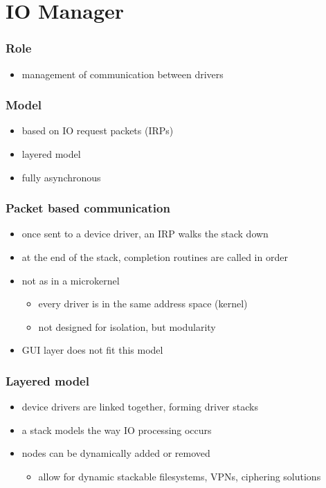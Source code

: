 %
%

\section{IO Manager}


\begin{frame}
 \frametitle{Role}
 \begin{itemize}
  \item
    management of communication between drivers
 \end{itemize}
\end{frame}


\begin{frame}
 \frametitle{Model}
 \begin{itemize}
  \item
    based on IO request packets (IRPs)
  \item
    layered model
  \item
    fully asynchronous
 \end{itemize}
\end{frame}


\begin{frame}
 \frametitle{Packet based communication}
 \begin{itemize}
  \item
    once sent to a device driver, an IRP walks the stack down
  \item
    at the end of the stack, completion routines are called in order
  \item
    not as in a microkernel
    \begin{itemize}
      \item
        every driver is in the same address space (kernel)
      \item
        not designed for isolation, but modularity
    \end{itemize}
  \item
    GUI layer does not fit this model
 \end{itemize}
\end{frame}


\begin{frame}
 \frametitle{Layered model}
 \begin{itemize}
   \item
     device drivers are linked together, forming driver stacks
   \item
     a stack models the way IO processing occurs
   \item
     nodes can be dynamically added or removed
     \begin{itemize}
       \item
         allow for dynamic stackable filesystems, VPNs, ciphering solutions
     \end{itemize}
 \end{itemize}
\end{frame}

